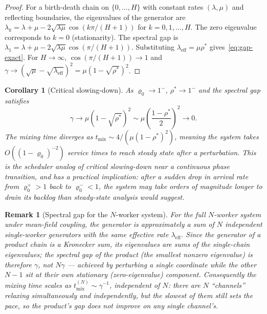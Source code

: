 \documentclass[11pt,a4paper]{article}
\newtheorem{corollary}[theorem]{Corollary}
\newtheorem{remark}{Remark}[section]
\newcommand{\rhostar}{\rho^{*}}
\newcommand{\rhozero}{\varrho_0}
\begin{document}
\begin{proof}
For a birth-death chain on $\{0,\ldots,H\}$ with constant rates
$(\lambda,\mu)$ and reflecting boundaries, the eigenvalues of the
generator are
$\lambda_k = \lambda + \mu - 2\sqrt{\lambda\mu}\cos(k\pi/(H+1))$
for $k = 0, 1, \ldots, H$.
The zero eigenvalue corresponds to $k=0$ (stationarity).
The spectral gap is $\lambda_1 = \lambda + \mu - 2\sqrt{\lambda\mu}\cos(\pi/(H+1))$.
Substituting $\lambda_{\mathrm{eff}} = \mu\rhostar$ gives~\eqref{eq:gap-exact}.
For $H \to \infty$, $\cos(\pi/(H+1)) \to 1$ and
$\gamma \to (\sqrt{\mu} - \sqrt{\lambda_{\mathrm{eff}}})^2 = \mu(1-\sqrt{\rhostar})^2$.
\end{proof}

\begin{corollary}[Critical slowing-down]
\label{cor:csd}
As $\rhozero \to 1^-$, $\rhostar \to 1^-$ and the spectral gap satisfies
\[
  \gamma \to \mu(1 - \sqrt{\rhostar})^2 \sim \mu\left(\frac{1-\rhostar}{2}\right)^2 \to 0.
\]
The mixing time diverges as $t_{\mathrm{mix}} \sim 4/(\mu(1-\rhostar)^2)$,
meaning the system takes $O((1-\rhozero)^{-2})$ service times to reach
steady state after a perturbation.
This is the scheduler analog of \emph{critical slowing-down} near a
continuous phase transition, and has a practical implication:
after a sudden drop in arrival rate from $\rhozero^+ > 1$ back to
$\rhozero^- < 1$, the system may take orders of magnitude longer to
drain its backlog than steady-state analysis would suggest.
\end{corollary}

\begin{remark}[Spectral gap for the $N$-worker system]
For the full $N$-worker system under mean-field coupling, the generator
is approximately a sum of $N$ independent single-worker generators with
the same effective rate $\lambda_{\mathrm{eff}}$. Since the generator of
a product chain is a Kronecker \emph{sum}, its eigenvalues are sums of
the single-chain eigenvalues; the spectral gap of the product (the
smallest nonzero eigenvalue) is therefore $\gamma$, not $N\gamma$ ---
achieved by perturbing a single coordinate while the other $N-1$ sit at
their own stationary (zero-eigenvalue) component. Consequently the
mixing time scales as $t_{\mathrm{mix}}^{(N)} \sim \gamma^{-1}$,
independent of $N$: there are $N$ ``channels'' relaxing simultaneously
and independently, but the slowest of them still sets the pace, so the
product's gap does not improve on any single channel's.
\end{remark}
\end{document}

